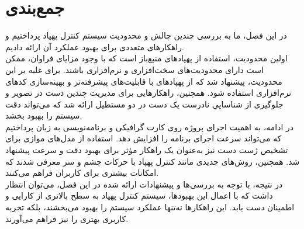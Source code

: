 \section{جمع‌بندی}
در این فصل، ما به بررسی چندین چالش و محدودیت سیستم کنترل پهپاد پرداختیم و راهکارهای متعددی برای بهبود عملکرد آن ارائه دادیم. 
\\
اولین محدودیت، استفاده از پهپادهای منبع‌باز است که با وجود مزایای فراوان، ممکن است دارای محدودیت‌های سخت‌افزاری و نرم‌افزاری باشند. برای غلبه بر این محدودیت، پیشنهاد شد که از پهپادهای با قابلیت‌های پیشرفته‌تر و 
بهینه‌سازی کدهای نرم‌افزاری استفاده شود. همچنین، راهکارهایی برای مدیریت چندین دست در تصویر و جلوگیری از شناسايي نادرست یک دست در دو مستطیل ارائه شد که می‌تواند دقت سیستم را بهبود بخشد.
\\
در ادامه، به اهمیت اجرای پروژه روی کارت گرافیکی و برنامه‌نویسی به زبان  پرداختیم که می‌تواند سرعت اجرای برنامه را افزایش دهد. استفاده از مدل‌های موازی برای تشخیص ژست دست نیز به‌عنوان یک راهکار مؤثر برای بهبود 
دقت و سرعت پیشنهاد شد. همچنین، روش‌های جدیدی مانند کنترل پهپاد با حرکات چشم و سر معرفی شدند که امکانات بیشتری برای کاربران فراهم می‌کنند.
\\
در نتیجه، با توجه به بررسی‌ها و پیشنهادات ارائه شده در این فصل، می‌توان انتظار داشت که با اعمال این بهبودها، سیستم کنترل پهپاد به سطح بالاتری از کارایی و اطمینان دست یابد. این راهکارها نه‌تنها عملکرد سیستم را بهبود می‌بخشند، بلکه تجربه کاربری بهتری را نیز فراهم می‌آورند.